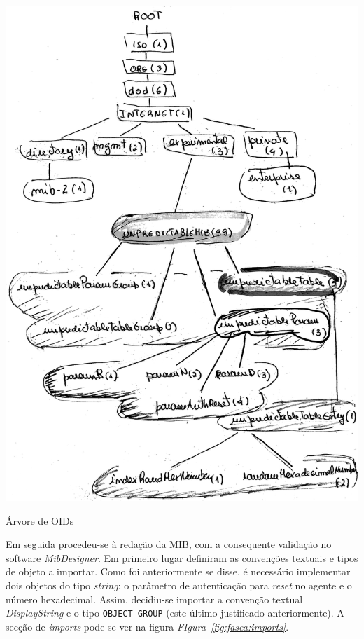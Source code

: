 \begin{center}
 	
	\includegraphics[scale=0.75,keepaspectratio]{resources/images/faseA/arvoreOID.png}
 	\captionsetup{type=figure, width=0.8\linewidth}
	\caption{Árvore de OIDs}
\label{fig:fasea:arvoreoids} 
\end{center}

\newpage

Em seguida procedeu-se à redação da MIB, com a consequente validação no software
\emph{MibDesigner}. Em primeiro lugar definiram as convenções textuais e tipos
de objeto a importar. Como foi anteriormente se disse, é necessário implementar
dois objetos do tipo \emph{string}: o parâmetro de autenticação para
\emph{reset} no agente e o número hexadecimal. Assim, decidiu-se importar
a convenção textual \emph{DisplayString} e o tipo \texttt{OBJECT-GROUP} (este
último justificado anteriormente). A secção de \emph{imports} pode-se ver na
figura \emph{FIgura~\ref{fig:fasea:imports}}.  

